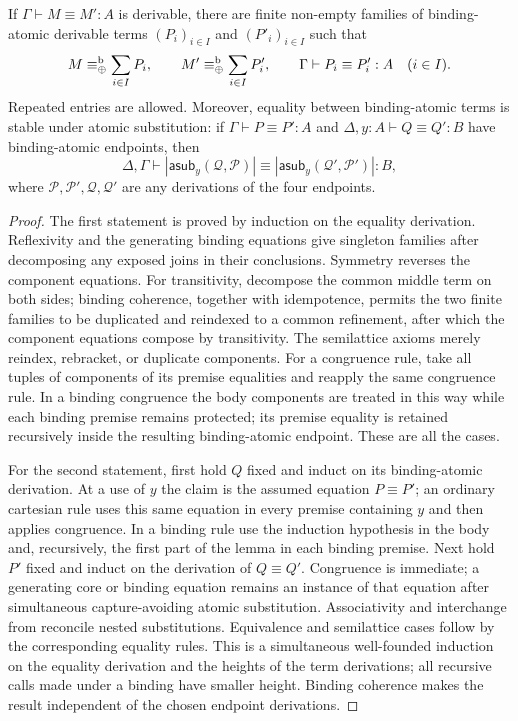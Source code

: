 \begin{lemma}
\label{lemma:letrec_equality_decomposition}
If $\Gamma\vdash M\equiv M':A$ is derivable, there are finite non-empty
families of binding-atomic derivable terms $(P_i)_{i\in I}$ and
$(P'_i)_{i\in I}$ such that
\[
M\equiv_{\mathbin{\oplus}}^{\mathrm b}\sum_{i\in I}P_i,
\qquad
M'\equiv_{\mathbin{\oplus}}^{\mathrm b}\sum_{i\in I}P'_i,
\qquad
\Gamma\vdash P_i\equiv P'_i:A
\quad(i\in I).
\]
Repeated entries are allowed.  Moreover, equality between binding-atomic
terms is stable under atomic substitution: if
$\Gamma\vdash P\equiv P':A$ and
$\Delta,y:A\vdash Q\equiv Q':B$ have binding-atomic endpoints, then
\[
\Delta,\Gamma\vdash
|\mathsf{asub}_y(\mathcal Q,\mathcal P)|
\equiv
|\mathsf{asub}_y(\mathcal Q',\mathcal P')|:B,
\]
where $\mathcal P,\mathcal P',\mathcal Q,\mathcal Q'$ are any derivations of
the four endpoints.
\end{lemma}
\begin{proof}
The first statement is proved by induction on the equality derivation.
Reflexivity and the generating binding equations give singleton families
after decomposing any exposed joins in their conclusions.  Symmetry reverses
the component equations.  For transitivity, decompose the common middle term
on both sides; binding coherence, together with idempotence, permits the two
finite families to be duplicated and reindexed to a common refinement, after
which the component equations compose by transitivity.  The semilattice
axioms merely reindex, rebracket, or duplicate components.  For a congruence
rule, take all tuples of components of its premise equalities and reapply the
same congruence rule.  In a binding congruence the body components are treated
in this way while each binding premise remains protected; its premise
equality is retained recursively inside the resulting binding-atomic
endpoint.  These are all the cases.

For the second statement, first hold $Q$ fixed and induct on its
binding-atomic derivation.  At a use of $y$ the claim is the assumed equation
$P\equiv P'$; an ordinary cartesian rule uses this same equation in every
premise containing $y$ and then applies congruence.  In a binding rule use the
induction hypothesis in the body and, recursively, the first part of the
lemma in each binding premise.  Next hold $P'$ fixed and induct on the
derivation of $Q\equiv Q'$.  Congruence is immediate; a generating core or
binding equation remains an instance of that equation after simultaneous
capture-avoiding atomic substitution.  Associativity and interchange from
 reconcile nested substitutions.
Equivalence and semilattice cases follow by the corresponding equality rules.
This is a simultaneous well-founded induction on the equality derivation and
the heights of the term derivations; all recursive calls made under a binding
have smaller height.  Binding coherence makes the result independent of the
chosen endpoint derivations.
\end{proof}

